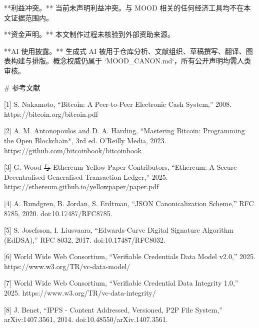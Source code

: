 \documentclass[10pt,a4paper]{article}
\begin{document}
**利益冲突。** 当前未声明利益冲突。与 MOOD 相关的任何经济工具均不在本文证据范围内。

**资金声明。** 本文制作过程未核验到外部资助来源。

**AI 使用披露。** 生成式 AI 被用于仓库分析、文献组织、草稿撰写、翻译、图表构建与排版。概念权威仍属于 `MOOD_CANON.md`，所有公开声明均需人类审核。

\# 参考文献

[1] S. Nakamoto, “Bitcoin: A Peer-to-Peer Electronic Cash System,” 2008. https://bitcoin.org/bitcoin.pdf

[2] A. M. Antonopoulos and D. A. Harding, *Mastering Bitcoin: Programming the Open Blockchain*, 3rd ed. O'Reilly Media, 2023. https://github.com/bitcoinbook/bitcoinbook

[3] G. Wood 与 Ethereum Yellow Paper Contributors, “Ethereum: A Secure Decentralised Generalised Transaction Ledger,” 2025. https://ethereum.github.io/yellowpaper/paper.pdf

[4] A. Rundgren, B. Jordan, S. Erdtman, “JSON Canonicalization Scheme,” RFC 8785, 2020. doi:10.17487/RFC8785.

[5] S. Josefsson, I. Liusvaara, “Edwards-Curve Digital Signature Algorithm (EdDSA),” RFC 8032, 2017. doi:10.17487/RFC8032.

[6] World Wide Web Consortium, “Verifiable Credentials Data Model v2.0,” 2025. https://www.w3.org/TR/vc-data-model/

[7] World Wide Web Consortium, “Verifiable Credential Data Integrity 1.0,” 2025. https://www.w3.org/TR/vc-data-integrity/

[8] J. Benet, “IPFS - Content Addressed, Versioned, P2P File System,” arXiv:1407.3561, 2014. doi:10.48550/arXiv.1407.3561.
\end{document}
